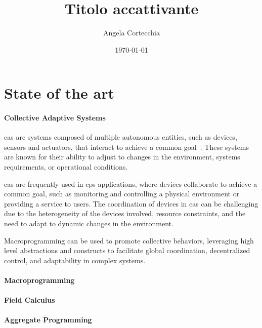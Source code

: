 \documentclass[12pt]{article}
\begin{document}
\title{Titolo accattivante}
\author{Angela Cortecchia}
\date{\today}
\maketitle

\setlength{\parindent}{0em}
\setlength{\parskip}{1em}

\section{State of the art}\label{sec:state-of-the-art}

\paragraph{Collective Adaptive Systems}

\ac{cas} are systems composed of multiple autonomous entities, such as devices, sensors and actuators,
that interact to achieve a common goal~\cite{ferscha2015}.
%
These systems are known for their ability to adjust to changes in the environment,
systems requirements, or operational conditions.

\ac{cas} are frequently used in \ac{cps} applications,
where devices collaborate to achieve a common goal,
such as monitoring and controlling a physical environment or providing a service to users.
%
The coordination of devices in \ac{cas} can be challenging due to the heterogeneity of the devices involved,
resource constraints, and the need to adapt to dynamic changes in the environment.

Macroprogramming can be used to promote collective behaviors,
leveraging high level abstractions and constructs to facilitate global coordination,
decentralized control, and adaptability in complex systems.


\paragraph{Macroprogramming}

\paragraph{Field Calculus}

\paragraph{Aggregate Programming}
\end{document}
